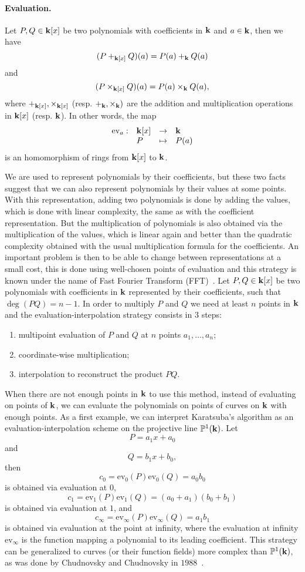 \paragraph{Evaluation.} Let $P, Q\in\mathbf{k}[x]$ be two polynomials with coefficients
in $\mathbf{k}$ and $a\in\mathbf{k}$, then we have
\[
  (P+_{\mathbf{k}[x]}Q)(a) = P(a) +_{\mathbf{k}} Q(a)
\]
and 
\[
  (P\times_{\mathbf{k}[x]} Q)(a) = P(a) \times_{\mathbf{k}} Q(a),
\]
where $+_{\mathbf{k}[x]}, \times_{\mathbf{k}[x]}$ (resp. $+_{\mathbf{k}}, \times_{\mathbf{k}})$ are the addition
and multiplication operations in $\mathbf{k}[x]$ (resp. $\mathbf{k}$).
In other words, the map
\[
\begin{array}{llll}
  \textrm{ev}_a:&\mathbf{k}[x]&\to&\mathbf{k}\\
  &P&\mapsto&P(a)
\end{array}
\]
is an homomorphism of rings from $\mathbf{k}[x]$ to $\mathbf{k}$.

We are used to represent polynomials by their coefficients, but these two facts
suggest that we can also represent polynomials by their values at some points.
With this representation, adding two polynomials is done by adding the
values, which is done with linear complexity, the same as with the coefficient
representation. But the multiplication of polynomials is also obtained via the
multiplication of the values, which is linear again and better than the
quadratic complexity obtained with the usual multiplication formula for the
coefficients. An important problem is then to be able to change between
representations at a small cost, this is done using well-chosen points of
evaluation and this strategy is known under the name of Fast Fourier
Transform (FFT)~\cite{GG13}. Let $P, Q\in\mathbf{k}[x]$ be two polynomials with
coefficients in $\mathbf{k}$ represented by their coefficients, such that
$\deg(PQ)=n-1$. In order to multiply $P$ and $Q$ we need at least $n$ points in
$\mathbf{k}$ and the evaluation-interpolation strategy consists in $3$ steps:
\begin{enumerate}
  \item multipoint evaluation of $P$ and $Q$ at $n$ points $a_1, \dots, a_n$;
  \item coordinate-wise multiplication;
  \item interpolation to reconstruct the product $PQ$.
\end{enumerate}
When there are not enough points in $\mathbf{k}$ to use this method, instead of
evaluating on points of $\mathbf{k}$, we can evaluate the polynomials on points of
curves on $\mathbf{k}$ with enough points. As a first example, we can interpret
Karatsuba's algorithm as an evaluation-interpolation scheme on
the projective line $\mathbb{P}^1(\mathbf{k})$. Let 
\[
  P = a_1 x + a_0
\]
and 
\[
  Q = b_1 x + b_0,
\]
then
\[
  c_0 = \textrm{ev}_0(P)\textrm{ev}_0(Q) = a_0b_0
\]
is obtained via evaluation at $0$,
\[
  c_1 = \textrm{ev}_1(P)\textrm{ev}_1(Q) = (a_0+a_1)(b_0+b_1)
\]
is obtained via evaluation at $1$, and
\[
  c_\infty = \textrm{ev}_\infty(P)\textrm{ev}_\infty(Q) = a_1b_1
\]
is obtained via evaluation at the point at infinity, where the evaluation at
infinity $\textrm{ev}_{\infty}$ is the function mapping a polynomial to its
leading coefficient. This strategy can be generalized to curves (or their
function fields) more complex
than $\mathbb{P}^1(\mathbf{k})$, as was done by Chudnovsky and Chudnovsky in
$1988$~\cite{CC88}.

